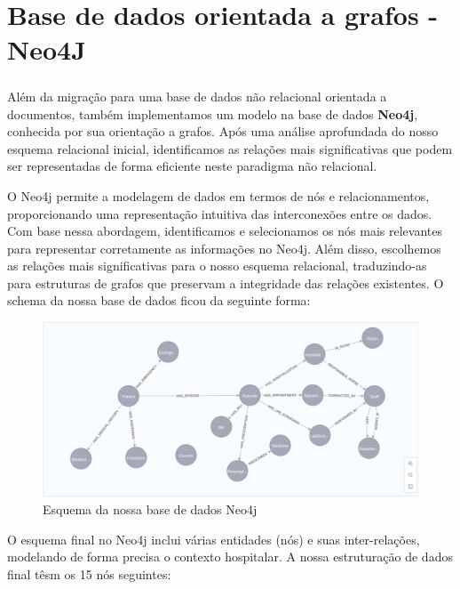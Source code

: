 \chapter{Base de dados orientada a grafos - Neo4J}
\paragraph{}
Além da migração para uma base de dados não relacional orientada a documentos, também implementamos um modelo na base de dados \textbf{Neo4j}, conhecida por sua orientação a grafos. Após uma análise aprofundada do nosso esquema relacional inicial, identificamos as relações mais significativas que podem ser representadas de forma eficiente neste paradigma não relacional.

O Neo4j permite a modelagem de dados em termos de nós e relacionamentos, proporcionando uma representação intuitiva das interconexões entre os dados. Com base nessa abordagem, identificamos e selecionamos os nós mais relevantes para representar corretamente as informações no Neo4j. Além disso, escolhemos as relações mais significativas para o nosso esquema relacional, traduzindo-as para estruturas de grafos que preservam a integridade das relações existentes. 
O schema da nossa base de dados ficou da seguinte forma:
\begin{figure}[h!]
    \centering
    \includegraphics[width=0.95\linewidth]{Imagens/Neo4j/esquema_neo4j.png}
    \caption{Esquema da nossa base de dados Neo4j}
    \label{fig:esquema_neo4js}
\end{figure}

O esquema final no Neo4j inclui várias entidades (nós) e suas inter-relações, modelando de forma precisa o contexto hospitalar. A nossa estruturação de dados final têsm os 15 nós seguintes:

